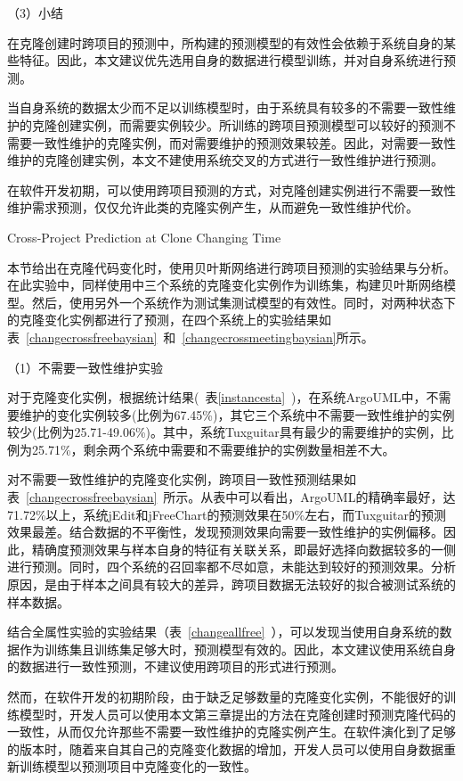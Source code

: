 （3）小结

在克隆创建时跨项目的预测中，所构建的预测模型的有效性会依赖于系统自身的某些特征。因此，本文建议优先选用自身的数据进行模型训练，并对自身系统进行预测。

当自身系统的数据太少而不足以训练模型时，由于系统具有较多的不需要一致性维护的克隆创建实例，而需要实例较少。所训练的跨项目预测模型可以较好的预测不需要一致性维护的克隆实例，而对需要维护的预测效果较差。因此，对需要一致性维护的克隆创建实例，本文不建使用系统交叉的方式进行一致性维护进行预测。

在软件开发初期，可以使用跨项目预测的方式，对克隆创建实例进行不需要一致性维护需求预测，仅仅允许此类的克隆实例产生，从而避免一致性维护代价。

{Cross-Project Prediction at Clone Changing Time}

本节给出在克隆代码变化时，使用贝叶斯网络进行跨项目预测的实验结果与分析。
在此实验中，同样使用中三个系统的克隆变化实例作为训练集，构建贝叶斯网络模型。然后，使用另外一个系统作为测试集测试模型的有效性。同时，对两种状态下的克隆变化实例都进行了预测，在四个系统上的实验结果如表~\ref{changecrossfreebaysian}~和~\ref{changecrossmeetingbaysian}所示。

（1）不需要一致性维护实验

对于克隆变化实例，根据统计结果(~表\ref{instancesta}~)，在系统ArgoUML中，不需要维护的变化实例较多(比例为67.45\%)，其它三个系统中不需要一致性维护的实例较少(比例为25.71-49.06\%)。其中，系统Tuxguitar具有最少的需要维护的实例，比例为25.71\%，剩余两个系统中需要和不需要维护的实例数量相差不大。

对不需要一致性维护的克隆变化实例，跨项目一致性预测结果如表~\ref{changecrossfreebaysian}~所示。从表中可以看出，ArgoUML的精确率最好，达71.72\%以上，系统jEdit和jFreeChart的预测效果在50\%左右，而Tuxguitar的预测效果最差。结合数据的不平衡性，发现预测效果向需要一致性维护的实例偏移。因此，精确度预测效果与样本自身的特征有关联关系，即最好选择向数据较多的一侧进行预测。同时，四个系统的召回率都不尽如意，未能达到较好的预测效果。分析原因，是由于样本之间具有较大的差异，跨项目数据无法较好的拟合被测试系统的样本数据。

结合全属性实验的实验结果（表~\ref{changeallfree}~），可以发现当使用自身系统的数据作为训练集且训练集足够大时，预测模型有效的。因此，本文建议使用系统自身的数据进行一致性预测，不建议使用跨项目的形式进行预测。

然而，在软件开发的初期阶段，由于缺乏足够数量的克隆变化实例，不能很好的训练模型时，开发人员可以使用本文第三章提出的方法在克隆创建时预测克隆代码的一致性，从而仅允许那些不需要一致性维护的克隆实例产生。在软件演化到了足够的版本时，随着来自其自己的克隆变化数据的增加，开发人员可以使用自身数据重新训练模型以预测项目中克隆变化的一致性。

